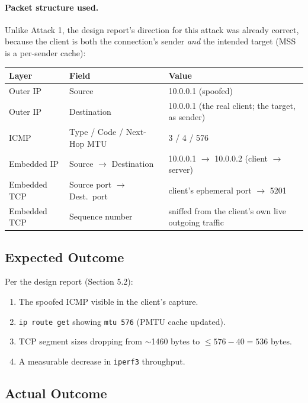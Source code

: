 \documentclass[11pt]{article}
\begin{document}
\paragraph{Packet structure used.} Unlike Attack 1, the design report's
direction for this attack was already correct, because the client is
both the connection's sender \emph{and} the intended target (MSS is a
per-sender cache):

\begin{center}
\begin{tabular}{@{}lll@{}}
\toprule
\textbf{Layer} & \textbf{Field} & \textbf{Value} \\
\midrule
Outer IP & Source & 10.0.0.1 (spoofed) \\
Outer IP & Destination & 10.0.0.1 (the real client; the target, as sender) \\
ICMP & Type / Code / Next-Hop MTU & 3 / 4 / 576 \\
Embedded IP & Source $\to$ Destination & 10.0.0.1 $\to$ 10.0.0.2 (client $\to$ server) \\
Embedded TCP & Source port $\to$ Dest.\ port & client's ephemeral port $\to$ 5201 \\
Embedded TCP & Sequence number & sniffed from the client's own live outgoing traffic \\
\bottomrule
\end{tabular}
\end{center}

\subsection{Expected Outcome}

Per the design report (Section 5.2):
\begin{enumerate}
    \item The spoofed ICMP visible in the client's capture.
    \item \texttt{ip route get} showing \texttt{mtu 576} (PMTU cache updated).
    \item TCP segment sizes dropping from $\sim$1460 bytes to $\le 576 - 40 = 536$ bytes.
    \item A measurable decrease in \texttt{iperf3} throughput.
\end{enumerate}

\subsection{Actual Outcome}
\end{document}
